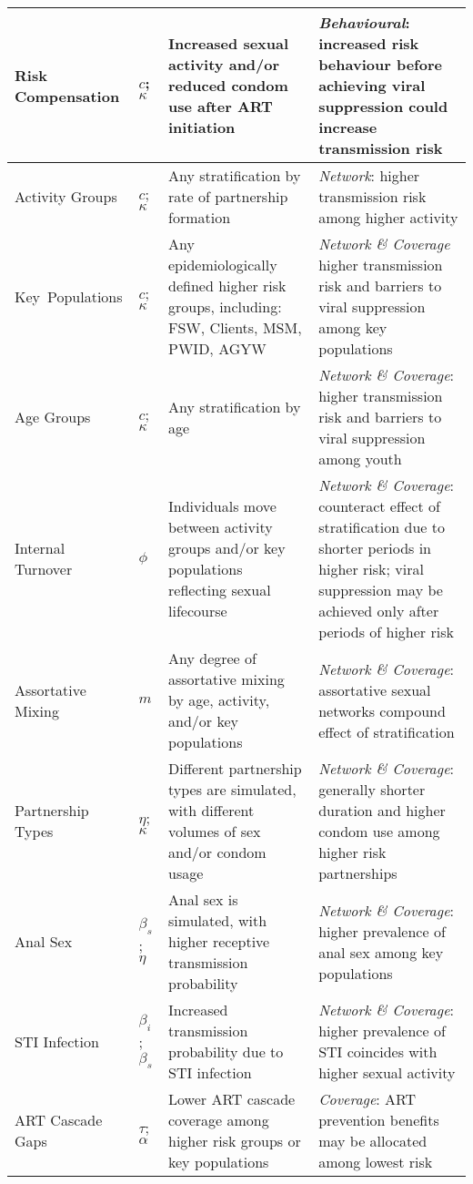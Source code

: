 \begin{tabular}{llp{.38\linewidth}p{.4\linewidth}}
\\
  Risk Compensation
& $c$; $\kappa$
& Increased sexual activity and/or reduced condom use after ART initiation
& \emph{Behavioural}: increased risk behaviour before achieving viral suppression could increase transmission risk
\\
\midrule
  Activity Groups
& $c$; $\kappa$
& Any stratification by rate of partnership formation
& \emph{Network}: higher transmission risk among higher activity
\\
  Key~Populations
& $c$; $\kappa$
& Any epidemiologically defined higher risk groups, including: FSW, Clients, MSM, PWID, AGYW
& \emph{Network \& Coverage} higher transmission risk and barriers to viral suppression among key populations\cite{}
\\
  Age Groups
& $c$; $\kappa$
& Any stratification by age
& \emph{Network \& Coverage}: higher transmission risk and barriers to viral suppression among youth\cite{}
\\
  Internal Turnover
& $\phi$
& Individuals move between activity groups and/or key populations reflecting sexual lifecourse
& \emph{Network \& Coverage}: counteract effect of stratification due to shorter periods in higher risk;\cite{}
viral suppression may be achieved only after periods of higher risk
\\
  Assortative Mixing
& $m$
& Any degree of assortative mixing by age, activity, and/or key populations
& \emph{Network \& Coverage}: assortative sexual networks compound effect of stratification\cite{}
\\
  Partnership Types
& $\eta$; $\kappa$
& Different partnership types are simulated, with different volumes of sex and/or condom usage
& \emph{Network \& Coverage}: generally shorter duration and higher condom use among higher risk partnerships
\\
  Anal Sex
& $\beta_s$; $\eta$
& Anal sex is simulated, with higher receptive transmission probability\cite{Baggaley2018}
& \emph{Network \& Coverage}: higher prevalence of anal sex among key populations\cite{Owen2017}
\\
  STI Infection
& $\beta_i$; $\beta_s$
& Increased transmission probability due to STI infection\cite{}
& \emph{Network \& Coverage}: higher prevalence of STI coincides with higher sexual activity\cite{}
\\
  ART Cascade Gaps
& $\tau$; $\alpha$
& Lower ART cascade coverage among higher risk groups or key populations\cite{}
& \emph{Coverage}: ART prevention benefits may be allocated among lowest risk
\\
\bottomrule
\end{tabular}
